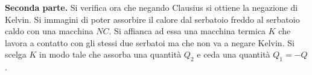 \documentclass[10pt,a4paper]{book}
\begin{document}
\textbf{Seconda parte.} Si verifica ora che negando Clausius si ottiene la negazione di Kelvin. Si immagini di poter assorbire il calore dal serbatoio freddo al serbatoio caldo con una macchina $NC$. Si affianca ad essa una macchina termica $K$ che lavora a contatto con gli stessi due serbatoi ma che non va a negare Kelvin. Si scelga $K$ in modo tale che assorba una quantità $Q_2$ e ceda una quantità $Q_1=-Q$.
\begin{figure}[htpb]
	\centering
	


	\begin{tikzpicture}[x=0.75pt,y=0.75pt,yscale=-1,xscale=1]


\end{tikzpicture}
\end{figure}
\end{document}
